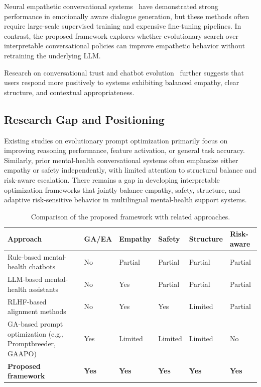 \documentclass[mathematics,article,xetex,moreauthors]{Definitions/mdpi}
\begin{document}
Neural empathetic conversational systems~\cite{empatheticagents2025} have
demonstrated strong performance in emotionally aware dialogue generation, but
these methods often require large-scale supervised training and expensive
fine-tuning pipelines. In contrast, the proposed framework explores whether
evolutionary search over interpretable conversational policies can improve
empathetic behavior without retraining the underlying LLM.

Research on conversational trust and chatbot
evolution~\cite{chatbotevolution2024} further suggests that users respond more
positively to systems exhibiting balanced empathy, clear structure, and
contextual appropriateness.

\subsection{Research Gap and Positioning}

Existing studies on evolutionary prompt optimization primarily focus on
improving reasoning performance, feature activation, or general task accuracy.
Similarly, prior mental-health conversational systems often emphasize either
empathy or safety independently, with limited attention to structural balance
and risk-aware escalation. There remains a gap in developing interpretable
optimization frameworks that jointly balance empathy, safety, structure, and
adaptive risk-sensitive behavior in multilingual mental-health support systems.

\begin{table}[H]
\centering
\caption{Comparison of the proposed framework with related approaches.}
\label{tab:related-comparison}
\renewcommand{\arraystretch}{1.2}
\begin{tabularx}{\textwidth}{
  >{\raggedright\arraybackslash}p{3.8cm}
  >{\centering\arraybackslash}p{1.3cm}
  >{\centering\arraybackslash}p{1.5cm}
  >{\centering\arraybackslash}p{1.5cm}
  >{\centering\arraybackslash}p{1.7cm}
  >{\centering\arraybackslash}p{1.8cm}
}
\toprule
\textbf{Approach} & \textbf{GA/EA} & \textbf{Empathy} &
\textbf{Safety} & \textbf{Structure} & \textbf{Risk-aware} \\
\midrule
Rule-based mental-health chatbots
  & No & Partial & Partial & Partial & Partial \\
LLM-based mental-health assistants
  & No & Yes & Partial & Partial & Partial \\
RLHF-based alignment methods
  & No & Yes & Yes & Limited & Partial \\
GA-based prompt optimization (e.g., Promptbreeder, GAAPO)
  & Yes & Limited & Limited & Limited & No \\
\rowcolor{gray!10}\textbf{Proposed framework}
  & \textbf{Yes} & \textbf{Yes} & \textbf{Yes} & \textbf{Yes} & \textbf{Yes} \\
\bottomrule
\end{tabularx}
\end{table}
\end{document}

